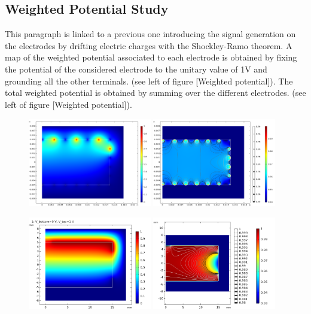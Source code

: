 \subsection{Weighted Potential Study}

This paragraph is linked to a previous one introducing the signal generation on the electrodes by drifting electric charges with the Shockley-Ramo theorem. A map of the weighted potential associated to each electrode is obtained by fixing the potential of the considered electrode to the unitary value of 1V and grounding all the other terminals. (see left of  figure [Weighted potential]). The total weighted potential is obtained by summing over the different electrodes. (see left of  figure [Weighted potential]).

\begin{figure}
\centering
\includegraphics[width=0.48\textwidth]{Figures/Electrodes/weighted_potential_collect.png}
\includegraphics[width=0.48\textwidth]{Figures/Electrodes/weighted_potential_total.png}

\includegraphics[width=0.48\textwidth]{Figures/Electrodes/weighted_potential_top.png}
\includegraphics[width=0.48\textwidth]{Figures/Electrodes/weighted_potential_total_planar38.png}



\end{figure}
